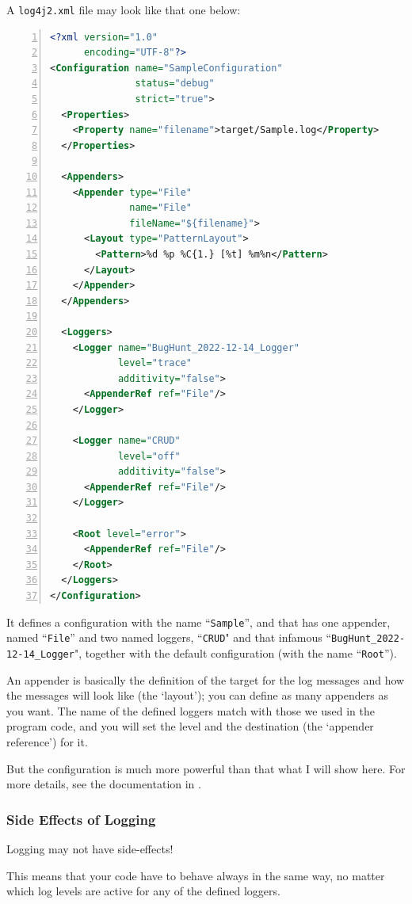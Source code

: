 \documentclass[11pt,a4paper, titlepage, parskip=half, headsepline, footsepline, cleardoublepage=current, headheight=1cm]{scrbook}
\begin{document}
A \verb#log4j2.xml# file may look like that one below:
\begin{lstlisting}[language=XML,numbers=left,caption={Sample Log4j Configuration}]
<?xml version="1.0"
      encoding="UTF-8"?>
<Configuration name="SampleConfiguration" 
               status="debug" 
               strict="true">
  <Properties>
    <Property name="filename">target/Sample.log</Property>
  </Properties>
 
  <Appenders>
    <Appender type="File" 
              name="File" 
              fileName="${filename}">
      <Layout type="PatternLayout">
        <Pattern>%d %p %C{1.} [%t] %m%n</Pattern>
      </Layout>
    </Appender>
  </Appenders>
 
  <Loggers>
    <Logger name="BugHunt_2022-12-14_Logger" 
            level="trace" 
            additivity="false">
      <AppenderRef ref="File"/>
    </Logger>
 
    <Logger name="CRUD" 
            level="off" 
            additivity="false">
      <AppenderRef ref="File"/>
    </Logger>
 
    <Root level="error">
      <AppenderRef ref="File"/>
    </Root>
  </Loggers>
</Configuration>
\end{lstlisting}

It defines a configuration with the name “\verb#Sample#”, and that has one appender, named “\verb#File#” and two named loggers, “\verb#CRUD#" and that infamous “\verb#BugHunt_2022-12-14_Logger#", together with the default configuration (with the name “\verb#Root#”).

An appender is basically the definition of the target for the log messages and how the messages will look like (the ‘layout’); you can define as many appenders as you want. The name of the defined loggers match with those we used in the program code, and you will set the level and the destination (the ‘appender reference’) for it.

But the configuration is much more powerful than that what I will show here. For more details, see the documentation in \autocite{APACHE_LOG4J:Configuration}.


\subsubsection{Side Effects of Logging}
Logging may not have side-effects!

This means that your code have to behave always in the same way, no matter which log levels are active for any of the defined loggers.
\end{document}
